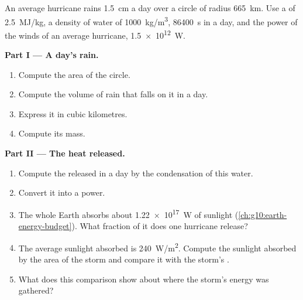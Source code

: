 \begin{problem}
\label{pb:g10:storms-and-cyclones:1}
An average hurricane rains \qty{1.5}{cm} a day over a circle of radius
\qty{665}{km}. Use a  of \qty{2.5}{MJ/kg}, a density of water of
\qty{1000}{kg/m^3}, \qty{86400}{s} in a day, and the power of the winds of
an average hurricane, \qty{1.5e12}{W}.

\medskip
\noindent\textbf{Part I --- A day's rain.}
\begin{enumerate}
  \item Compute the area of the circle.
  \item Compute the volume of rain that falls on it in a day.
  \item Express it in cubic kilometres.
  \item Compute its mass.
\end{enumerate}

\medskip
\noindent\textbf{Part II --- The heat released.}
\begin{enumerate}[resume]
  \item Compute the  released in a day by the condensation of
        this water.
  \item Convert it into a power.
  \item The whole Earth absorbs about \qty{1.22e17}{W} of sunlight
        (\cref{ch:g10:earth-energy-budget}). What fraction of it does one
        hurricane release?
  \item The average sunlight absorbed is \qty{240}{W/m^2}. Compute the
        sunlight absorbed by the area of the storm and compare it with the
        storm's .
  \item What does this comparison show about where the storm's energy was
        gathered?
\end{enumerate}


\end{problem}
